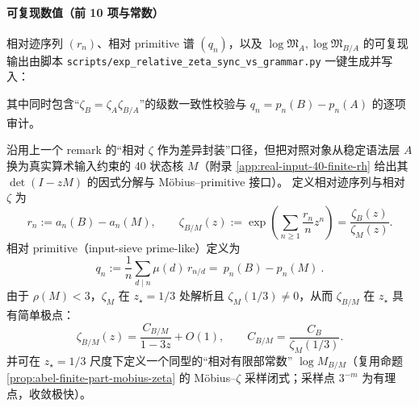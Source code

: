 \begin{remark}
\paragraph{可复现数值（前 10 项与常数）}
相对迹序列 \((r_n)\)、相对 primitive 谱 \((q_n)\)，以及 \(\log\mathfrak{M}_A,\log\mathfrak{M}_{B/A}\) 的可复现输出由脚本
\texttt{scripts/exp\_relative\_zeta\_sync\_vs\_grammar.py} 一键生成并写入：

其中同时包含“\(\zeta_B=\zeta_A\zeta_{B/A}\)”的级数一致性校验与 \(q_n=p_n(B)-p_n(A)\) 的逐项审计。
\end{remark}

\begin{remark}\label{rem:relative-zeta-sync-vs-real-input}
沿用上一个 remark 的“相对 \(\zeta\) 作为差异封装”口径，但把对照对象从稳定语法层 \(A\) 换为真实算术输入约束的 40 状态核 \(M\)（附录 \ref{app:real-input-40-finite-rh} 给出其 \(\det(I-zM)\) 的因式分解与 Möbius--primitive 接口）。
定义相对迹序列与相对 \(\zeta\) 为
\[
r_n:=a_n(B)-a_n(M),\qquad
\zeta_{B/M}(z):=\exp\!\left(\sum_{n\ge 1}\frac{r_n}{n}z^n\right)=\frac{\zeta_B(z)}{\zeta_M(z)}.
\]
相对 primitive（input-sieve prime-like）定义为
\[
q_n:=\frac{1}{n}\sum_{d\mid n}\mu(d)\,r_{n/d}=\boxed{\ p_n(B)-p_n(M)\ }.
\]
由于 \(\rho(M)<3\)，\(\zeta_M\) 在 \(z_\star=1/3\) 处解析且 \(\zeta_M(1/3)\neq 0\)，从而 \(\zeta_{B/M}\) 在 \(z_\star\) 具有简单极点：
$$
\zeta_{B/M}(z)=\frac{C_{B/M}}{1-3z}+O(1),
\qquad
C_{B/M}=\frac{C_B}{\zeta_M(1/3)}.
$$
并可在 \(z_\star=1/3\) 尺度下定义一个同型的“相对有限部常数” \(\log M_{B/M}\)（复用命题 \ref{prop:abel-finite-part-mobius-zeta} 的 Möbius--\(\zeta\) 采样闭式；采样点 \(3^{-m}\) 为有理点，收敛极快）。


\end{remark}
